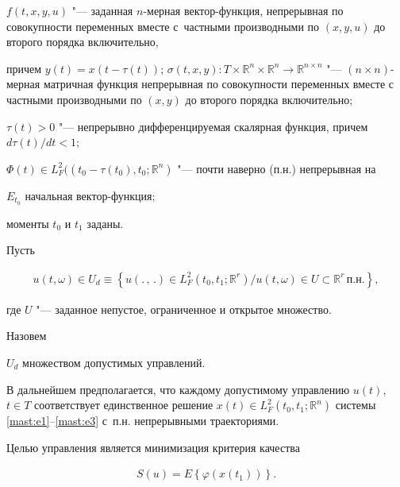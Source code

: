 $ f(t,x,y,u) $ "--- заданная $ n $-мерная вектор-функция, непрерывная по совокупности переменных вместе с~частными производными по $ (x,y,u) $ до второго порядка включительно, 

причем $ y(t)=x(t-\tau (t)) $; $ \sigma(t,x,y): T\times  \mathbb R^{n} \times \mathbb R^{n} \rightarrow \mathbb R^{n\times n}$ "--- $ (n\times n) $- мерная матричная  функция непрерывная по совокупности переменных вместе с частными производными по  $ (x,y) $ до  второго порядка включительно; 

$ \tau (t) >0 $ "--- непрерывно дифференцируемая скалярная функция, причем $ {d\tau (t)}/{dt}<1 $;  

$ \Phi (t) \in L^{2}_{F} ((t_{0}-\tau(t_{0}), t_{0}; \mathbb R^{n}) $ "--- почти наверно (п.н.) непрерывная на 

$ E_{t_{0}} $  начальная вектор-функция; 

моменты $ t_{0} $  и $ t_{1} $  заданы.



Пусть

\begin{gather}

\label{mast:e4}

u(t,\omega)\in U_{d}\equiv \left\lbrace u(.\,,\,.)\in L^{2}_{F}(t_{0}, t_{1}; \mathbb R^{r})/u(t,\omega)\in U\subset \mathbb R^{r} \,\text{п.н.} \right\rbrace  ,

\end{gather}

где $ U $ "--- заданное непустое, ограниченное и открытое множество.

Назовем 

$ U_{d} $  множеством допустимых управлений.



В дальнейшем предполагается,  что каждому допустимому управлению $ u(t) $, $ t\in T $  соответствует единственное решение $ x(t)\in L_{F}^{2} (t_{0}, t_{1}; \mathbb R^{n}) $  системы \eqref{mast:e1}--\eqref{mast:e3}  с~п.н. непрерывными траекториями.



Целью управления является минимизация критерия качества 

\begin{gather}

\label{mast:e5}

S(u)=E  \left\lbrace \varphi (x(t_{1})) \right\rbrace .

\end{gather}


